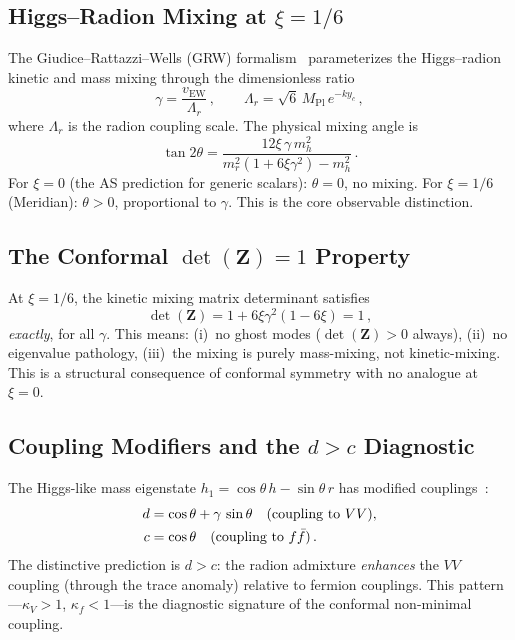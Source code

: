 \subsection{Higgs--Radion Mixing at $\xi = 1/6$}
\label{sec:4-higgs-radion}

The Giudice--Rattazzi--Wells (GRW) formalism~\cite{ch4:GRW2001} parameterizes the Higgs--radion kinetic and mass mixing through the dimensionless ratio
\begin{equation}
  \gamma = \frac{v_{\mathrm{EW}}}{\Lambda_r}\,, \qquad
  \Lambda_r = \sqrt{6}\, M_{\mathrm{Pl}}\, e^{-ky_c}\,,
  \label{eq:4-122}
\end{equation}
where $\Lambda_r$ is the radion coupling scale. The physical mixing angle is~\cite{ch4:GRW2001}
\begin{equation}
  \tan 2\theta = \frac{12\xi\, \gamma\, m_h^2}{m_r^2(1 + 6\xi\gamma^2) - m_h^2}\,.
  \label{eq:4-123}
\end{equation}
For $\xi = 0$ (the AS prediction for generic scalars): $\theta = 0$, no mixing. For $\xi = 1/6$ (Meridian): $\theta > 0$, proportional to $\gamma$. This is the core observable distinction.

\subsection{The Conformal $\det(\mathbf{Z}) = 1$ Property}
\label{sec:4-det-z}

At $\xi = 1/6$, the kinetic mixing matrix determinant satisfies
\begin{equation}
  \det(\mathbf{Z}) = 1 + 6\xi\gamma^2(1 - 6\xi) = 1\,,
  \label{eq:4-124}
\end{equation}
\emph{exactly}, for all $\gamma$. This means: (i)~no ghost modes ($\det(\mathbf{Z}) > 0$ always), (ii)~no eigenvalue pathology, (iii)~the mixing is purely mass-mixing, not kinetic-mixing. This is a structural consequence of conformal symmetry with no analogue at $\xi = 0$.

\subsection{Coupling Modifiers and the $d > c$ Diagnostic}
\label{sec:4-coupling-modifiers}

The Higgs-like mass eigenstate $h_1 = \cos\theta\, h - \sin\theta\, r$ has modified couplings~\cite{ch4:GRW2001}:
\begin{align}
  d &= \cos\theta + \gamma\, \sin\theta \quad (\text{coupling to } VV),
  \label{eq:4-125}\\
  c &= \cos\theta \quad (\text{coupling to } f\bar{f})\,.
  \notag
\end{align}
The distinctive prediction is $d > c$: the radion admixture \emph{enhances} the $VV$ coupling (through the trace anomaly) relative to fermion couplings. This pattern---$\kappa_V > 1$, $\kappa_f < 1$---is the diagnostic signature of the conformal non-minimal coupling.

